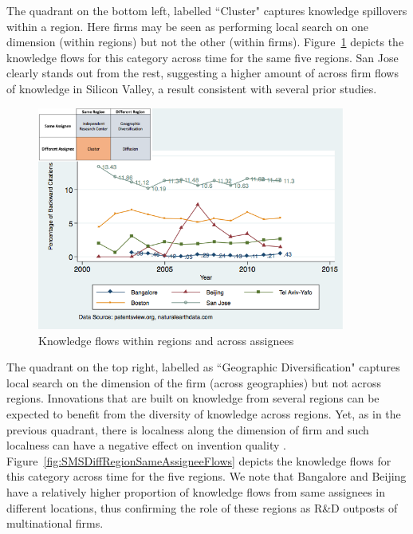 \documentclass[12pt,letterpaper]{article}
\begin{document}
The quadrant on the bottom left, labelled ``Cluster" captures knowledge spillovers within a region. Here firms may be seen as performing local search on one dimension (within regions) but not the other (within firms). Figure~\ref{fig:SMSSameRegionDiffAssigneeFlows} depicts the knowledge flows for this category across time for the same five regions. San Jose clearly stands out from the rest, suggesting a higher amount of across firm flows of knowledge in Silicon Valley, a result consistent with several prior studies. \par

\begin{figure}[h!]
\begin{centering}
  \caption{Knowledge flows within regions and across assignees}
  \label{fig:SMSSameRegionDiffAssigneeFlows}
  \includegraphics[width=0.90\textwidth]{SMSSameRegionDiffAssigneeFlows}
\end{centering}
\end{figure}

The quadrant on the top right, labelled as ``Geographic Diversification" captures local search on the dimension of the firm (across geographies) but not across regions. Innovations that are built on knowledge from several regions can be expected to benefit from the diversity of knowledge across regions. Yet, as in the previous quadrant, there is localness along the dimension of firm and such localness can have a negative effect on invention quality \citep{Rosenkopf2001}. Figure~\ref{fig:SMSDiffRegionSameAssigneeFlows} depicts the  knowledge flows for this category across time for the five regions. We note that Bangalore and Beijing have a relatively higher proportion of knowledge flows from same assignees in different locations, thus confirming the role of these regions as R\&D outposts of multinational firms.\par
\end{document}
